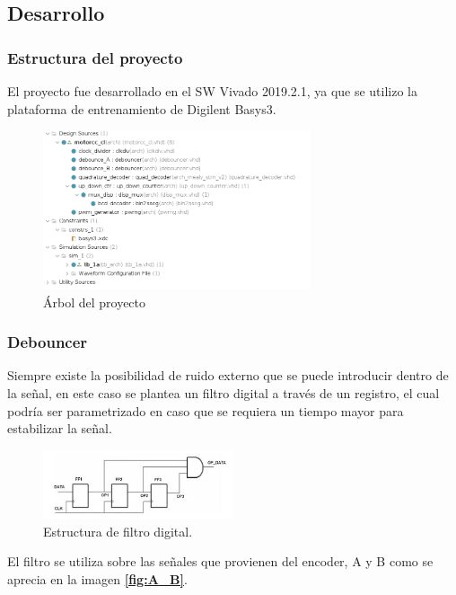 \documentclass[11pt, a4paper]{article}
\begin{document}
\subsection{Desarrollo}

	\subsubsection{Estructura del proyecto}
	El proyecto fue desarrollado en el SW Vivado 2019.2.1, ya que se utilizo la plataforma de entrenamiento de Digilent Basys3.

	\begin{figure}[H]
		\centering
		\includegraphics[width=0.7\textwidth]{Imagenes/estructura.png}
		\caption{Árbol del proyecto}
		\label{fig:proyecto_vivado}
	\end{figure} 

	\subsubsection{Debouncer}
	Siempre existe la posibilidad de ruido externo que se puede introducir dentro de la señal, en este caso se plantea un filtro digital a través de un registro, el cual podría ser parametrizado en caso que se requiera un tiempo mayor para estabilizar la señal.

	\begin{figure}[H]
		\centering
		\includegraphics[width=0.5\textwidth]{Imagenes/debouncer.png}
		\caption{Estructura de filtro digital.}
		\label{fig:debouncer}
	\end{figure} 

	El filtro se utiliza sobre las señales que provienen del encoder, A y B como se aprecia en la imagen \textcolor{blue}{\textbf{\ref{fig:A_B}}}.
\end{document}
